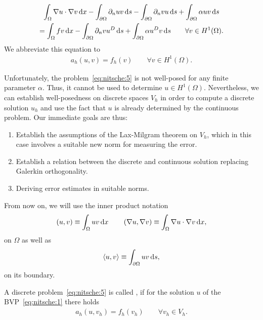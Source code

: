 \begin{intro}
\begin{multline}
    \label{eq:nitsche:4}
    \int_\Omega \nabla u \cdot \nabla v \,\mathrm{d} x
    -\int_{\partial\Omega} \partial_n u v \,\mathrm{d} s
    -\int_{\partial\Omega} \partial_n v u \,\mathrm{d} s
    + \int_{\partial\Omega} \alpha u v \,\mathrm{d} s
    \\
    = \int_\Omega fv\,\mathrm{d} x
    -\int_{\partial\Omega} \partial_n v u^D \,\mathrm{d} s
    + \int_{\partial\Omega} \alpha u^D v \,\mathrm{d} s
    \qquad\forall v\in H^1(\Omega).
  \end{multline}
  We abbreviate this equation to
  \begin{gather}
    \label{eq:nitsche:5}
    a_h(u,v) = f_h(v) \qquad\forall v\in H^1(\Omega).
  \end{gather}
\end{intro}

\begin{note}
  Unfortunately, the problem~\eqref{eq:nitsche:5} is not well-posed
  for any finite parameter $\alpha$. Thus, it cannot be used to
  determine $u\in H^1(\Omega)$. Nevertheless, we can establish
  well-posedness on discrete spaces $V_h$ in order to compute a
  discrete solution $u_h$ and use the fact that $u$ is already
  determined by the continuous problem. Our immediate goals are thus:
  \begin{enumerate}
  \item Establish the assumptions of the Lax-Milgram theorem on $V_h$,
    which in this case involves a suitable new norm for measuring the
    error.
  \item Establish a relation between the discrete and continuous
    solution replacing Galerkin orthogonality.
  \item Deriving error estimates in suitable norms.
  \end{enumerate}
\end{note}

\begin{notation}
  From now on, we will use the inner product notation
  \begin{gather*}
    \form(u,v) \equiv \int_\Omega uv\dx
    \qquad
    \form(\nabla u,\nabla v) \equiv \int_\Omega \nabla u\cdot\nabla v\dx,
  \end{gather*}
  on $\Omega$ as well as
  \begin{gather*}
    \forme(u,v) \equiv \int_{\partial\Omega} uv\ds,
  \end{gather*}
  on its boundary.
\end{notation}

\begin{definition}
  A discrete problem~\eqref{eq:nitsche:5} is called ,
  if for the solution $u$ of the BVP~\eqref{eq:nitsche:1} there holds
  \begin{gather}
    a_h(u,v_h) = f_h(v_h) \qquad \forall v_h\in V_h.
  \end{gather}
\end{definition}


